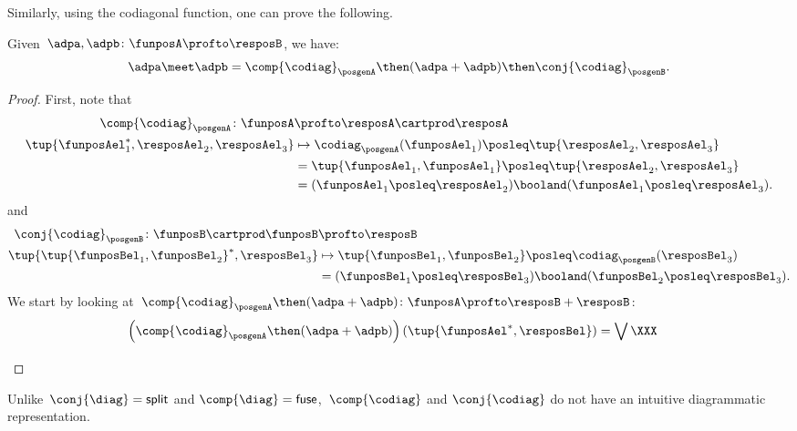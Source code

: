 Similarly, using the codiagonal function, one can prove the following.
\begin{lemma}
    Given~$\adpa, \adpb\colon \funposA \profto \resposB$, we have:
    \begin{equation}
        \adpa \meet \adpb = \comp{\codiag}_\posgenA \then(\adpa + \adpb) \then \conj{\codiag}_\posgenB.
    \end{equation}
\end{lemma}
\begin{proof}
    First, note that
    \begin{equation}
        \begin{aligned}
            \comp{\codiag}_\posgenA \colon \funposA&\profto \resposA\cartprod \resposA\\
            \tup{\funposAel_1^*,\resposAel_2,\resposAel_3}&\mapsto \codiag_\posgenA(\funposAel_1)\posleq \tup{\resposAel_2,\resposAel_3}\\
            &= \tup{\funposAel_1,\funposAel_1}\posleq \tup{\resposAel_2,\resposAel_3}\\
            &= (\funposAel_1\posleq \resposAel_2) \booland (\funposAel_1\posleq \resposAel_3).
        \end{aligned}
    \end{equation}
    and
    \begin{equation}
        \begin{aligned}
            \conj{\codiag}_\posgenB \colon \funposB\cartprod \funposB&\profto \resposB\\
            \tup{\tup{\funposBel_1,\funposBel_2}^*,\resposBel_3}&\mapsto \tup{\funposBel_1,\funposBel_2}\posleq \codiag_\posgenB(\resposBel_3)\\
            &= (\funposBel_1\posleq \resposBel_3) \booland (\funposBel_2\posleq \resposBel_3).
        \end{aligned}
    \end{equation}
    We start by looking at~$\comp{\codiag}_\posgenA \then (\adpa+\adpb) \colon \funposA\profto \resposB+\resposB$:
    \begin{equation}
        \begin{aligned}
            \left(\comp{\codiag}_\posgenA\then (\adpa+\adpb)\right)\left(\tup{\funposAel^*,\resposBel}\right)&=\bigvee_{} \XXX
        \end{aligned}
    \end{equation}
\end{proof}
Unlike~$\conj{\diag} = \mathsf{split}$ and $\comp{\diag} = \mathsf{fuse}$,~$\comp{\codiag}$ and $\conj{\codiag}$ do not have an intuitive diagrammatic representation.

